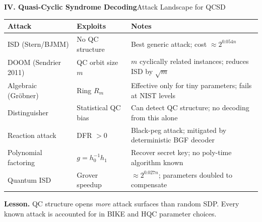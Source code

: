 \begin{frame}[shrink=5]{\textbf{IV. Quasi-Cyclic Syndrome Decoding}}{Attack Landscape for QCSD}
\begin{center}
\renewcommand{\arraystretch}{1.24}
\begin{tabular}{p{}p{}p{}}
\toprule
Attack & Exploits & Notes \\
\midrule
ISD (Stern/BJMM) & No QC structure & Best generic attack; cost $\approx 2^{0.054n}$ \\
DOOM (Sendrier 2011) & QC orbit size $m$ & $m$ cyclically related instances; reduces ISD by $\sqrt{m}$ \\
Algebraic (Gröbner) & Ring $R_m$ & Effective only for tiny parameters; fails at NIST levels \\
Distinguisher & Statistical QC bias & Can detect QC structure; no decoding from this alone \\
Reaction attack & DFR $>0$ & Black-peg attack; mitigated by deterministic BGF decoder \\
Polynomial factoring & $g=h_0^{-1}h_1$ & Recover secret key; no poly-time algorithm known \\
Quantum ISD & Grover speedup & $\approx 2^{0.027n}$; parameters doubled to compensate \\
\bottomrule
\end{tabular}
\end{center}
\vspace{-.1cm}
\textbf{Lesson.}\; QC structure opens \emph{more} attack surfaces than random SDP.
Every known attack is accounted for in BIKE and HQC parameter choices.
\end{frame}

